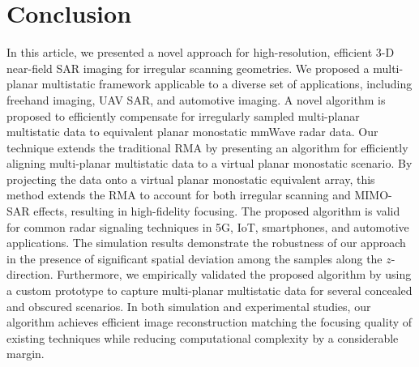 \documentclass{ieeeaccess}
\begin{document}
\section{Conclusion}
\label{sec:conclusion}
In this article, we presented a novel approach for high-resolution, efficient \mbox{3-D} near-field SAR imaging for irregular scanning geometries. 
We proposed a multi-planar multistatic framework applicable to a diverse set of applications, including freehand imaging, UAV SAR, and automotive imaging. 
A novel algorithm is proposed to efficiently compensate for irregularly sampled multi-planar multistatic data to equivalent planar monostatic mmWave radar data. 
Our technique extends the traditional RMA by presenting an algorithm for efficiently aligning multi-planar multistatic data to a virtual planar monostatic scenario. 
By projecting the data onto a virtual planar monostatic equivalent array, this method extends the RMA to account for both irregular scanning and MIMO-SAR effects, resulting in high-fidelity focusing. 
The proposed algorithm is valid for common radar signaling techniques in 5G, IoT, smartphones, and automotive applications. 
The simulation results demonstrate the robustness of our approach in the presence of significant spatial deviation among the samples along the $z$-direction. 
Furthermore, we empirically validated the proposed algorithm by using a custom prototype to capture multi-planar multistatic data for several concealed and obscured scenarios.
In both simulation and experimental studies, our algorithm achieves efficient image reconstruction matching the focusing quality of existing techniques while reducing computational complexity by a considerable margin. 

\appendices
\end{document}
